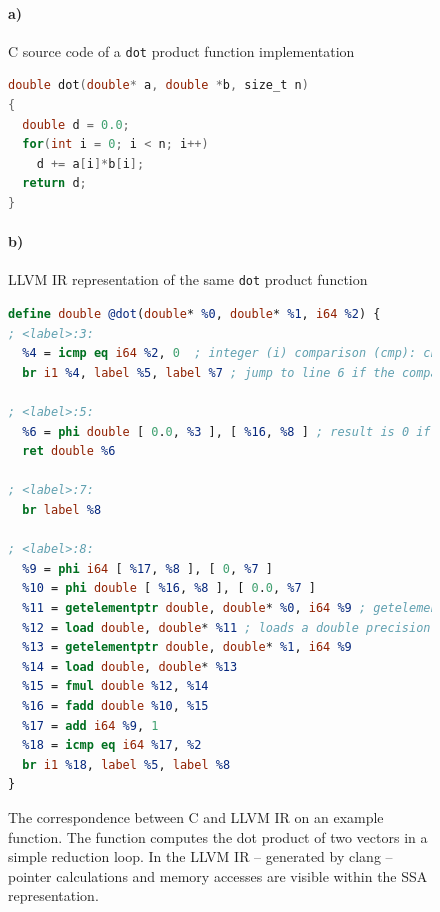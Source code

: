 \begin{figure}[p]
\paragraph*{a)} C source code of a {\tt dot} product function implementation
\begin{lstlisting}[language=C]
double dot(double* a, double *b, size_t n)
{
  double d = 0.0;
  for(int i = 0; i < n; i++)
    d += a[i]*b[i];
  return d;
}
\end{lstlisting}

\paragraph*{b)} LLVM IR representation of the same {\tt dot} product function
\begin{lstlisting}[language=LLVM,breaklines=true]
define double @dot(double* %0, double* %1, i64 %2) {
; <label>:3:
  %4 = icmp eq i64 %2, 0  ; integer (i) comparison (cmp): check if register %2 is equal (eq) to constant zero
  br i1 %4, label %5, label %7 ; jump to line 6 if the comparison held, otherwise jump to line 10 instead

; <label>:5:
  %6 = phi double [ 0.0, %3 ], [ %16, %8 ] ; result is 0 if the phi node was reached from line 4, otherwise it was reached from line 24 and the result is taken from %16
  ret double %6

; <label>:7:
  br label %8

; <label>:8:
  %9 = phi i64 [ %17, %8 ], [ 0, %7 ]
  %10 = phi double [ %16, %8 ], [ 0.0, %7 ]
  %11 = getelementptr double, double* %0, i64 %9 ; getelementpointer calculates memory addresses, here it computes the address of the %9-th value in the array %0
  %12 = load double, double* %11 ; loads a double precision floating point value from the calculated address
  %13 = getelementptr double, double* %1, i64 %9
  %14 = load double, double* %13
  %15 = fmul double %12, %14
  %16 = fadd double %10, %15
  %17 = add i64 %9, 1
  %18 = icmp eq i64 %17, %2
  br i1 %18, label %5, label %8
}
\end{lstlisting}
\caption{The correspondence between C and LLVM IR on an example function.
         The function computes the dot product of two vectors in a simple
         reduction loop.
         In the LLVM IR -- generated by clang -- pointer calculations and memory
         accesses are visible within the SSA representation.}
\label{llvmirexample}
\end{figure}

